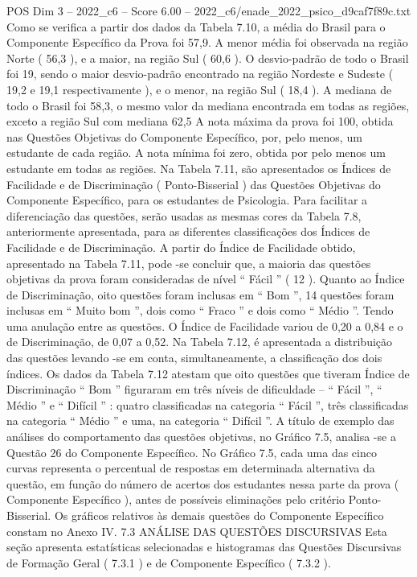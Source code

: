 \begin{textsample}{POS Dim 3 – 2022\_c6 – Score 6.00 – 2022\_c6/enade\_2022\_psico\_d9caf7f89c.txt}
Como se verifica a partir dos dados da Tabela 7.10, a média do Brasil para o Componente Específico da Prova foi 57,9.
A menor média foi observada na região Norte ( 56,3 ), e a maior, na região Sul ( 60,6 ).
O desvio-padrão de todo o Brasil foi 19, sendo o maior desvio-padrão encontrado na região Nordeste e Sudeste ( 19,2 e 19,1 respectivamente ), e o menor, na região Sul ( 18,4 ).
A mediana de todo o Brasil foi 58,3, o mesmo valor da mediana encontrada em todas as regiões, exceto a região Sul com mediana 62,5 A nota máxima da prova foi 100, obtida nas Questões Objetivas do Componente Específico, por, pelo menos, um estudante de cada região.
A nota mínima foi zero, obtida por pelo menos um estudante em todas as regiões.
Na Tabela 7.11, são apresentados os Índices de Facilidade e de Discriminação ( Ponto-Bisserial ) das Questões Objetivas do Componente Específico, para os estudantes de Psicologia.
Para facilitar a diferenciação das questões, serão usadas as mesmas cores da Tabela 7.8, anteriormente apresentada, para as diferentes classificações dos Índices de Facilidade e de Discriminação.
A partir do Índice de Facilidade obtido, apresentado na Tabela 7.11, pode -se concluir que, a maioria das questões objetivas da prova foram consideradas de nível “ Fácil ” ( 12 ).
Quanto ao Índice de Discriminação, oito questões foram inclusas em “ Bom ”, 14 questões foram inclusas em “ Muito bom ”, dois como “ Fraco ” e dois como “ Médio ”.
Tendo uma anulação entre as questões.
O Índice de Facilidade variou de 0,20 a 0,84 e o de Discriminação, de 0,07 a 0,52.
Na Tabela 7.12, é apresentada a distribuição das questões levando -se em conta, simultaneamente, a classificação dos dois índices.
Os dados da Tabela 7.12 atestam que oito questões que tiveram Índice de Discriminação “ Bom ” figuraram em três níveis de dificuldade – “ Fácil ”, “ Médio ” e “ Difícil ” : quatro classificadas na categoria “ Fácil ”, três classificadas na categoria “ Médio ” e uma, na categoria “ Difícil ”.
A título de exemplo das análises do comportamento das questões objetivas, no Gráfico 7.5, analisa -se a Questão 26 do Componente Específico.
No Gráfico 7.5, cada uma das cinco curvas representa o percentual de respostas em determinada alternativa da questão, em função do número de acertos dos estudantes nessa parte da prova ( Componente Específico ), antes de possíveis eliminações pelo critério Ponto-Bisserial.
Os gráficos relativos às demais questões do Componente Específico constam no Anexo IV. 7.3 ANÁLISE DAS QUESTÕES DISCURSIVAS Esta seção apresenta estatísticas selecionadas e histogramas das Questões Discursivas de Formação Geral ( 7.3.1 ) e de Componente Específico ( 7.3.2 ).

\end{textsample}
